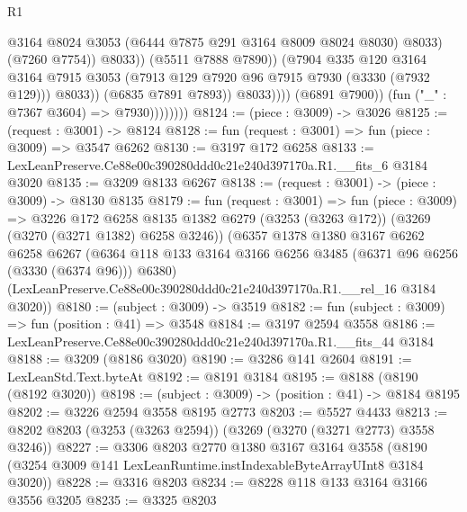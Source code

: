 \begin{lexlean}{R1}
\begin{coremodule}
                                          @3164
                                          @8024
                                          @3053
                                          (@6444 @7875 @291 @3164 @8009 @8024 @8030)
                                          @8033)
                                        (@7260 @7754))
                                      @8033))
                                  (@5511 @7888 @7890))
                                (@7904
                                  @335
                                  @120
                                  @3164
                                  @3164
                                  @7915
                                  @3053
                                  (@7913 @129 @7920 @96 @7915 @7930 (@3330 (@7932 @129)))
                                  @8033))
                              (@6835 @7891 @7893))
                            @8033))))
                    (@6891 @7900))
                  (fun ("_" : @7367 @3604) => @7930))))))))
@8124 := (piece : @3009) -> @3026
@8125 := (request : @3001) -> @8124
@8128 := fun (request : @3001) => fun (piece : @3009) => @3547 @6262
@8130 := @3197 @172 @6258
@8133 := LexLeanPreserve.Ce88e00c390280ddd0c21e240d397170a.R1.__fits_6 @3184 @3020
@8135 := @3209 @8133 @6267
@8138 := (request : @3001) -> (piece : @3009) -> @8130 @8135
@8179 := fun (request : @3001) =>
  fun (piece : @3009) =>
  @3226
    @172
    @6258
    @8135
    @1382
    @6279
    (@3253 (@3263 @172))
    (@3269 (@3270 (@3271 @1382) @6258 @3246))
    (@6357
      @1378
      @1380
      @3167
      @6262
      @6258
      @6267
      (@6364 @118 @133 @3164 @3166 @6256 @3485 (@6371 @96 @6256 (@3330 (@6374 @96))) @6380)
      (LexLeanPreserve.Ce88e00c390280ddd0c21e240d397170a.R1.__rel_16 @3184 @3020))
@8180 := (subject : @3009) -> @3519
@8182 := fun (subject : @3009) => fun (position : @41) => @3548
@8184 := @3197 @2594 @3558
@8186 := LexLeanPreserve.Ce88e00c390280ddd0c21e240d397170a.R1.__fits_44 @3184
@8188 := @3209 (@8186 @3020)
@8190 := @3286 @141 @2604
@8191 := LexLeanStd.Text.byteAt
@8192 := @8191 @3184
@8195 := @8188 (@8190 (@8192 @3020))
@8198 := (subject : @3009) -> (position : @41) -> @8184 @8195
@8202 := @3226 @2594 @3558 @8195 @2773
@8203 := @5527 @4433
@8213 := @8202 @8203 (@3253 (@3263 @2594)) (@3269 (@3270 (@3271 @2773) @3558 @3246))
@8227 := @3306
    @8203
    @2770
    @1380
    @3167
    @3164
    @3558
    (@8190 (@3254 @3009 @141 LexLeanRuntime.instIndexableByteArrayUInt8 @3184 @3020))
@8228 := @3316 @8203
@8234 := @8228 @118 @133 @3164 @3166 @3556 @3205
@8235 := @3325 @8203

\end{coremodule}
\end{lexlean}
